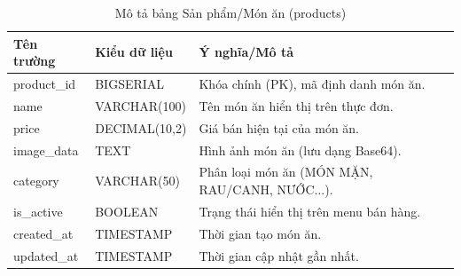 \documentclass[../20232006p.tex]{subfiles}
\begin{document}
\begin{table}[H]
    \centering
    \caption{Mô tả bảng Sản phẩm/Món ăn (products)}
    \label{tab:products}
    \begin{tabular}{|p{3.5cm}|p{3cm}|p{7.5cm}|}
        \hline
        \textbf{Tên trường} & \textbf{Kiểu dữ liệu} & \textbf{Ý nghĩa/Mô tả}                         \\
        \hline
        product\_id         & BIGSERIAL             & Khóa chính (PK), mã định danh món ăn.          \\
        \hline
        name                & VARCHAR(100)          & Tên món ăn hiển thị trên thực đơn.             \\
        \hline
        price               & DECIMAL(10,2)         & Giá bán hiện tại của món ăn.                   \\
        \hline
        image\_data         & TEXT                  & Hình ảnh món ăn (lưu dạng Base64).             \\
        \hline
        category            & VARCHAR(50)           & Phân loại món ăn (MÓN MẶN, RAU/CANH, NƯỚC...). \\
        \hline
        is\_active          & BOOLEAN               & Trạng thái hiển thị trên menu bán hàng.        \\
        \hline
        created\_at         & TIMESTAMP             & Thời gian tạo món ăn.                          \\
        \hline
        updated\_at         & TIMESTAMP             & Thời gian cập nhật gần nhất.                   \\
        \hline
    \end{tabular}
\end{table}
\end{document}

